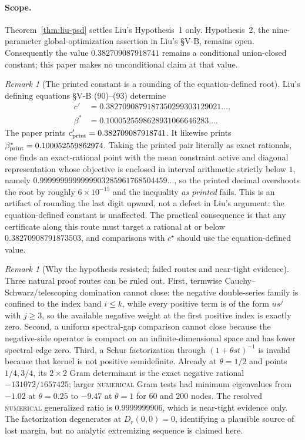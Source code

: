 \documentclass[11pt]{article}
\theoremstyle{plain}
\theoremstyle{definition}
\theoremstyle{remark}
\newtheorem{remark}[theorem]{Remark}
\newcommand{\NUMERICAL}{\textsc{numerical}}
\begin{document}
\paragraph{Scope.}
Theorem~\ref{thm:liu-psd} settles Liu's Hypothesis~1 only.  Hypothesis~2, the
nine-parameter global-optimization assertion in Liu's \S V-B, remains open.
Consequently the value $0.382709087918741$ remains a conditional
union-closed constant; this paper makes no unconditional claim at that value.

\begin{remark}[The printed constant is a rounding of the equation-defined root]
\label{rem:liu-rounding}
Liu's defining equations \S V-B (90)--(93) determine
\[
\begin{aligned}
c'&=0.3827090879187350299303129021\ldots,\\
\beta^{*}&=0.1000525598628931066646283\ldots.
\end{aligned}
\]
The paper prints \(c'_{\rm print}=0.382709087918741\).  It likewise prints
\(\beta^{*}_{\rm print}=0.100052559862974\).
Taking the printed pair literally as exact rationals, one finds an
exact-rational point with the mean constraint active and
diagonal representation whose objective is enclosed in interval arithmetic
strictly below $1$, namely
$0.9999999999999903285961768504459\ldots$, so the printed decimal overshoots
the root by roughly $6\times10^{-15}$ and the inequality \emph{as printed}
fails.  This is an artifact of rounding the last digit upward, not a defect
in Liu's argument: the equation-defined constant is unaffected.  The
practical consequence is that any certificate along this route must target a
rational at or below $0.38270908791873503$, and comparisons with $c^\star$
should use the equation-defined value.
\end{remark}

\begin{remark}[Why the hypothesis resisted; failed routes and near-tight evidence]
Three natural proof routes can be ruled out.  First, termwise
Cauchy--Schwarz/telescoping domination cannot close: the negative double-series
family is confined to the index band $i\le k$, while every positive term is of
the form $us^j$ with $j\ge3$, so the available negative weight at the first
positive index is exactly zero.  Second, a uniform spectral-gap comparison
cannot close because the negative-side operator is compact on an
infinite-dimensional space and has lower spectral edge zero.  Third, a Schur
factorization through $(1+\theta st)^{-1}$ is invalid because that kernel is
not positive semidefinite.  Already at $\theta=1/2$ and points $1/4,3/4$, its
$2\times2$ Gram determinant is the exact negative rational
$-131072/1657425$; larger \NUMERICAL{} Gram tests had minimum eigenvalues from
$-1.02$ at $\theta=0.25$ to $-9.47$ at $\theta=1$ for $60$ and $200$ nodes.
The resolved \NUMERICAL{} generalized ratio is $0.9999999906$, which is
near-tight evidence only.  The factorization degenerates at
$D_r(0,0)=0$, identifying a plausible source of lost margin, but no analytic
extremizing sequence is claimed here.
\end{remark}
\end{document}
